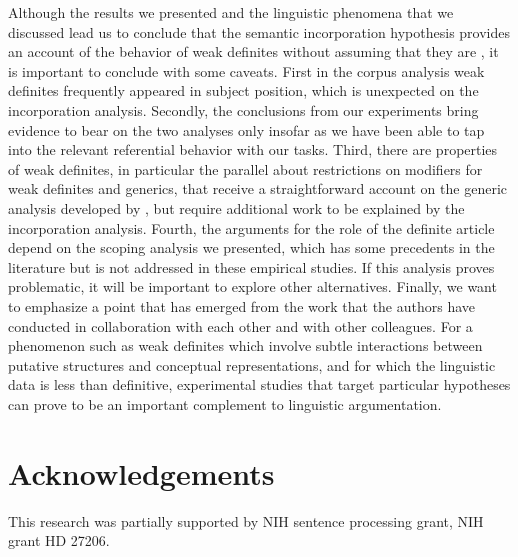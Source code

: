 \documentclass[output=paper,
modfonts
]{langscibook}
\begin{document}
Although the results we presented and the linguistic phenomena that we discussed lead us to conclude that the semantic incorporation hypothesis provides an account of the behavior of weak definites without assuming that they are , it is important to conclude with some caveats. First in the corpus analysis weak definites frequently appeared in subject position, which is unexpected on the incorporation analysis. Secondly, the conclusions from our experiments bring evidence to bear on the two analyses only insofar as we have been able to tap into the relevant referential behavior with our tasks. Third, there are properties of weak definites, in particular the parallel about restrictions on modifiers for weak definites and generics, that receive a straightforward account on the generic analysis developed by \citet{Aguilar-Guevara2014}, but require additional work to be explained by the incorporation analysis.  Fourth, the arguments for the role of the definite article depend on the scoping analysis we presented, which has some precedents in the literature but is not addressed in these empirical studies.  If this analysis proves problematic, it will be important to explore other alternatives. Finally, we want to emphasize a point that has emerged from the work that the authors have conducted in collaboration with each other and with other colleagues. For a phenomenon such as weak definites which involve subtle interactions between putative structures and conceptual representations, and for which the linguistic data is less than definitive, experimental studies that target particular hypotheses can prove to be an important complement to linguistic argumentation.

     
\section*{Acknowledgements}
This research was partially supported by NIH sentence processing grant, NIH grant HD 27206.
\end{document}
